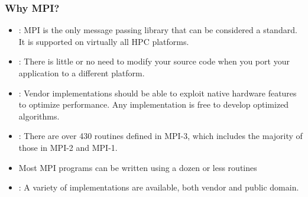 \documentclass[9pt,c]{beamer}
\begin{document}
\begin{frame}
  \frametitle{Why MPI?}
  \begin{itemize}
    \item {}: MPI is the only message passing library that can be considered a standard. It is supported on virtually all HPC platforms.
    \item {}: There is little or no need to modify your source code when you port your application to a different platform.
    \item {}: Vendor implementations should be able to exploit native hardware features to optimize performance. Any implementation is free to develop optimized algorithms.
    \item {}: There are over 430 routines defined in MPI-3, which includes the majority of those in MPI-2 and MPI-1.
    \item[] Most MPI programs can be written using a dozen or less routines
    \item {}: A variety of implementations are available, both vendor and public domain.
  \end{itemize}
\end{frame}
\end{document}
